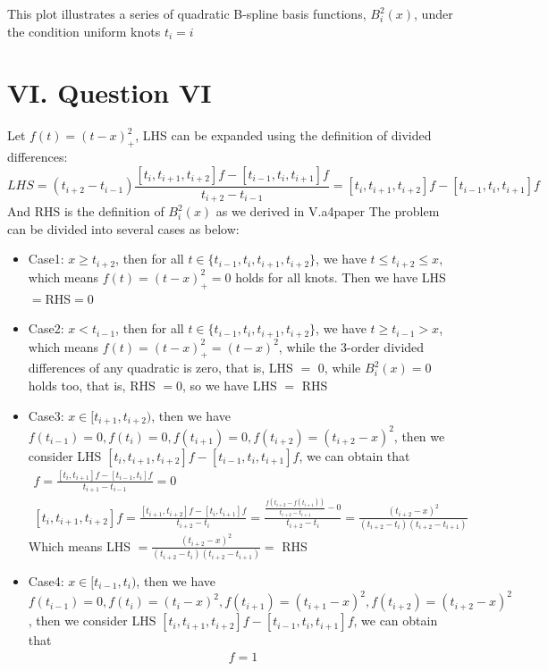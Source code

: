 \documentclass[a4paper]{article}
\begin{document}
This plot illustrates a series of quadratic B-spline basis functions, $B_i^2(x)$, under the condition uniform knots $t_i=i$

\section*{VI. Question VI}

Let $f(t)=(t-x)^2_{+}$, LHS can be expanded using the definition of divided differences:
\begin{equation}
  LHS=(t_{i+2}-t_{i-1})\frac{[t_i,t_{i+1},t_{i+2}]f-[t_{i-1},t_i,t_{i+1}]f}{t_{i+2}-t_{i-1}}=[t_i,t_{i+1},t_{i+2}]f-[t_{i-1},t_i,t_{i+1}]f
\end{equation}
And RHS is the definition of $B_i^2(x)$ as we derived in V.a4paper
The problem can be divided into several cases as below:
\begin{itemize}
  \item Case1: $x\geq t_{i+2}$, then for all $t\in\{t_{i-1},t_i,t_{i+1},t_{i+2}\}$, we have $t\leq t_{i+2}\leq x$, which means $f(t)=(t-x)^2_{+}=0$ holds for all knots. Then we have LHS$=$RHS$=0$
  \item Case2: $x<t_{i-1}$, then for all $t\in\{t_{i-1},t_i,t_{i+1},t_{i+2}\}$, we have $t\geq t_{i-1}>x$, which means $f(t)=(t-x)^2_+=(t-x)^2$, while the 3-order divided differences of any quadratic is zero, that is,
  LHS $=$ 0, while $B_i^2(x)=0$ holds too, that is, RHS $=0$, so we have LHS $=$ RHS
  \item Case3: $x\in[t_{i+1},t_{i+2})$, then we have $f(t_{i-1})=0,f(t_i)=0,f(t_{i+1})=0,f(t_{i+2})=(t_{i+2}-x)^2$, then we consider LHS $[t_i,t_{i+1},t_{i+2}]f-[t_{i-1},t_i,t_{i+1}]f$, we can obtain that
    \begin{align}
      [t_{i-1},t_i,t_{i+1}]f=\frac{[t_i,t_{i+1}]f-[t_{i-1},t_i]f}{t_{i+1}-t_{i-1}}=0\\
      [t_i,t_{i+1},t_{i+2}]f=\frac{[t_{i+1},t_{i+2}]f-[t_i,t_{i+1}]f}{t_{i+2}-t_i}=\frac{\frac{f(t_{i+2}-f(t_{i+1}))}{t_{i+2}-t_{i+1}}-0}{t_{i+2}-t_i}=\frac{(t_{i+2}-x)^2}{(t_{i+2}-t_i)(t_{i+2}-t_{i+1})}
    \end{align}
  Which means LHS $=\frac{(t_{i+2}-x)^2}{(t_{i+2}-t_i)(t_{i+2}-t_{i+1})}=$ RHS
  \item Case4: $x\in[t_{i-1},t_i)$, then we have $f(t_{i-1})=0, f(t_i)=(t_i-x)^2,f(t_{i+1})=(t_{i+1}-x)^2,f(t_{i+2})=(t_{i+2}-x)^2$, then we consider LHS $[t_i,t_{i+1},t_{i+2}]f-[t_{i-1},t_i,t_{i+1}]f$, we can obtain that
    \begin{align}
      [t_i,t_{i+1},t_{i+2}]f=1\\

\end{align}
\end{itemize}
\end{document}
